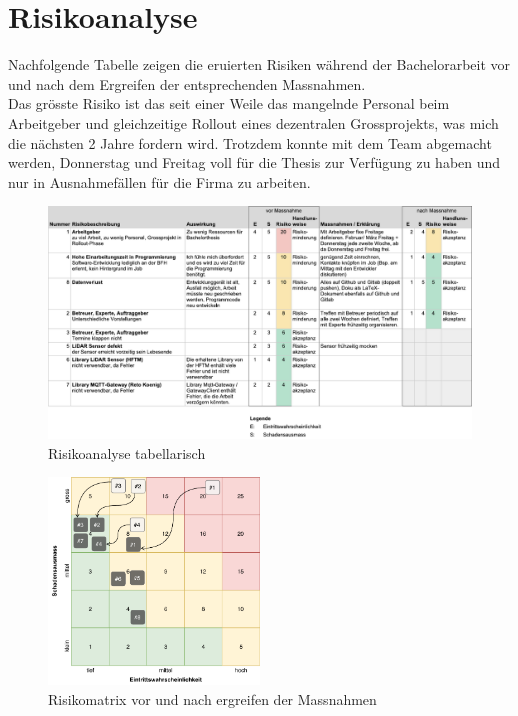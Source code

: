 \section{Risikoanalyse}
Nachfolgende Tabelle zeigen die eruierten Risiken während der Bachelorarbeit vor und nach dem Ergreifen der entsprechenden Massnahmen. \\ Das grösste Risiko ist das seit einer Weile das mangelnde Personal beim Arbeitgeber und gleichzeitige Rollout eines dezentralen Grossprojekts, was mich die nächsten 2 Jahre fordern wird. Trotzdem konnte mit dem Team abgemacht werden, Donnerstag und Freitag voll für die Thesis zur Verfügung zu haben und nur in Ausnahmefällen für die Firma zu arbeiten.
\begin{figure}[H]
	\centering
	\includegraphics[width=1.0\textwidth]{img/risikoanalyse-tabelle.pdf}
	\caption{Risikoanalyse tabellarisch}
	\label{fig:risikoanalyse-tabelle}
\end{figure}
\begin{figure}[H]
	\centering
	\includegraphics[width=0.5\textwidth]{img/risikoanalyse-matrix.pdf}
	\caption{Risikomatrix vor und nach ergreifen der Massnahmen}
	\label{fig:risikoanalyse-matrix}
\end{figure}


